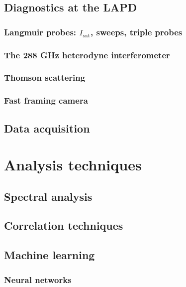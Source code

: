 \subsection{Diagnostics at the LAPD}

\subsubsection{Langmuir probes: $I_\text{sat}$, sweeps, triple probes}

\subsubsection{The 288 GHz heterodyne interferometer}

\subsubsection{Thomson scattering}

\subsubsection{Fast framing camera}

\subsection{Data acquisition}

\section{Analysis techniques}

\subsection{Spectral analysis}

\subsection{Correlation techniques}

\subsection{Machine learning}

\subsubsection{Neural networks}
